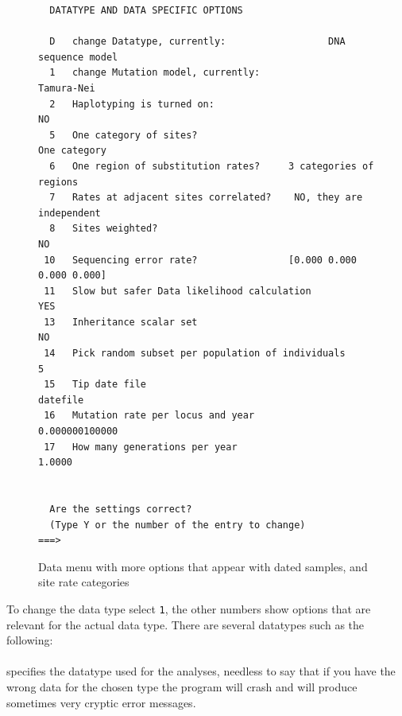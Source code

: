 \begin{figure}[bht]

\begin{center}
\begin{boxedminipage}[t]{14.5cm}
\begin{small}
\begin{tt}
\begin{verbatim}
  DATATYPE AND DATA SPECIFIC OPTIONS

  D   change Datatype, currently:                  DNA sequence model
  1   change Mutation model, currently:                    Tamura-Nei
  2   Haplotyping is turned on:                                    NO
  5   One category of sites?                             One category
  6   One region of substitution rates?     3 categories of regions
  7   Rates at adjacent sites correlated?    NO, they are independent
  8   Sites weighted?                                              NO
 10   Sequencing error rate?                [0.000 0.000 0.000 0.000]
 11   Slow but safer Data likelihood calculation                  YES
 13   Inheritance scalar set                                       NO
 14   Pick random subset per population of individuals              5
 15   Tip date file                                          datefile
 16   Mutation rate per locus and year                 0.000000100000
 17   How many generations per year                            1.0000


  Are the settings correct?
  (Type Y or the number of the entry to change)
===> 
\end{verbatim}
\end{tt}
\end{small}
\end{boxedminipage}
\end{center}
\caption{{\sf Data menu with more options that appear with dated samples, and site rate categories}}
\label{DATAMENU2}
\end{figure}
To change the data type select {\tt 1}, the other numbers show
options that are relevant for the actual data type. There are several
datatypes such as the following:\\
{}\\
specifies the datatype used for the analyses, needless to say
that if you have the wrong data for the chosen type the program
will crash and will produce sometimes very cryptic error messages.
